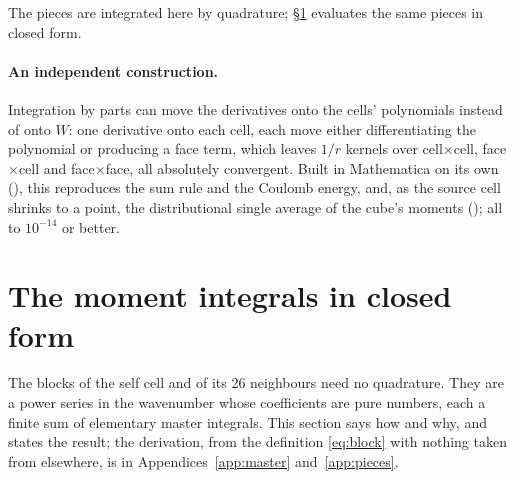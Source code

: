 \documentclass[11pt,a4paper]{article}
\begin{document}
The pieces are integrated here by quadrature; \S\ref{sec:moments} evaluates the same pieces in closed form.

\paragraph{An independent construction.} Integration by parts can move the derivatives onto the cells'
polynomials instead of onto $W$: one derivative onto each cell, each move either differentiating the
polynomial or producing a face term, which leaves $1/r$ kernels over cell$\times$cell, face$\times$cell
and face$\times$face, all absolutely convergent. Built in Mathematica on its own (),
this reproduces the sum rule and the Coulomb energy, and, as the source cell shrinks to a point, the
distributional single average of the cube's moments (); all to $10^{-14}$ or
better.

\section{The moment integrals in closed form}\label{sec:moments}

The blocks of the self cell and of its 26 neighbours need no quadrature. They are a power series in the
wavenumber whose coefficients are pure numbers, each a finite sum of elementary master integrals. This
section says how and why, and states the result; the derivation, from the definition
\eqref{eq:block} with nothing taken from elsewhere, is in Appendices~\ref{app:master}
and~\ref{app:pieces}.
\end{document}
